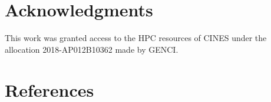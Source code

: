 \documentclass[review]{elsarticle}
\begin{document}
\section*{Acknowledgments}
\noindent
This  work  was  granted  access  to  the  HPC  resources  of CINES under the 
allocation 2018-AP012B10362 made by GENCI.

\section*{References}


\end{document}
